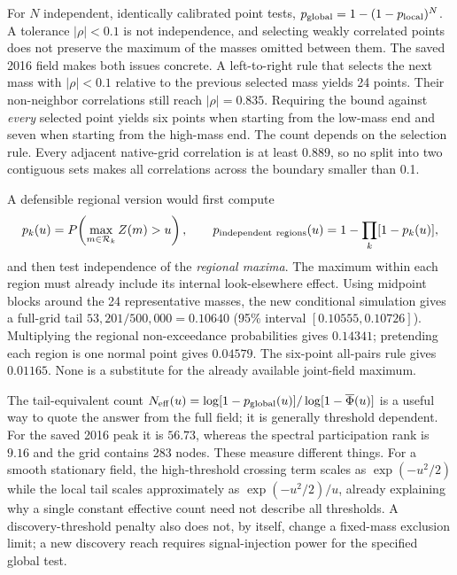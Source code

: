 For $N$ independent, identically calibrated point tests,
$p_{\rm global}=1-(1-p_{\rm local})^N$. A tolerance $|\rho|<0.1$ is not
independence, and selecting weakly correlated points does not preserve the
maximum of the masses omitted between them. The saved 2016 field makes both
issues concrete. A left-to-right rule that selects the next mass with
$|\rho|<0.1$ relative to the previous selected mass yields 24 points. Their
non-neighbor correlations still reach $|\rho|=0.835$.
Requiring the bound against \emph{every} selected point yields six points when
starting from the low-mass end and seven when starting from the high-mass end.
The count depends on the selection rule. Every adjacent native-grid correlation
is at least $0.889$, so no split into two contiguous sets makes all correlations
across the boundary smaller than 0.1.

A defensible regional version would first compute
\begin{equation}
 p_k(u)=P\!\left(\max_{m\in\mathcal R_k} Z(m)>u\right),\qquad
 p_{\rm independent\ regions}(u)=1-\prod_k[1-p_k(u)],
\end{equation}
and then test independence of the \emph{regional maxima}. The maximum within
each region must already include its internal look-elsewhere effect.
Using midpoint blocks around the 24 representative masses, the new conditional
simulation gives a full-grid tail $53{,}201/500{,}000=0.10640$
(95\% interval $[0.10555,0.10726]$). Multiplying the regional non-exceedance
probabilities gives $0.14341$; pretending each region is one normal point gives
$0.04579$. The six-point all-pairs rule gives $0.01165$.
None is a substitute for the already available joint-field maximum.


The tail-equivalent count
$N_{\rm eff}(u)=\log[1-p_{\rm global}(u)]/\log[1-\overline\Phi(u)]$
is a useful way to quote the answer from the full field; it is generally
threshold dependent. For the saved 2016 peak it is $56.73$, whereas the spectral
participation rank is $9.16$ and the grid contains 283 nodes. These measure
different things. For a smooth stationary field, the high-threshold crossing
term scales as $\exp(-u^2/2)$ while the local tail scales approximately as
$\exp(-u^2/2)/u$, already explaining why a single constant effective count need
not describe all thresholds. A discovery-threshold penalty also does not, by
itself, change a fixed-mass exclusion limit; a new discovery reach requires
signal-injection power for the specified global test.

